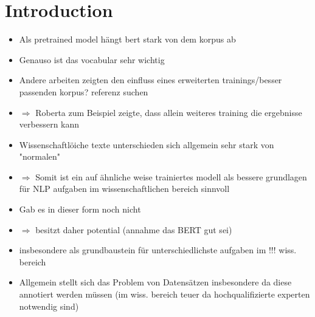 \chapter{Introduction}
\color{ForestGreen}
\begin{itemize}
	\item Als pretrained model hängt bert stark von dem korpus ab
	\item Genauso ist das vocabular sehr wichtig
	\item Andere arbeiten zeigten den einfluss eines erweiterten trainings/besser passenden korpus? referenz suchen
	\item $\Longrightarrow$ Roberta zum Beispiel zeigte, dass allein weiteres training die ergebnisse verbessern kann
	\item Wissenschaftlöiche texte unterschieden sich allgemein sehr stark von "normalen"
	\item $\Rightarrow$ Somit ist ein auf ähnliche weise trainiertes modell als bessere grundlagen für NLP aufgaben im wissenschaftlichen bereich sinnvoll
	\item Gab es in dieser form noch nicht
	\item $\Rightarrow$ besitzt daher potential (annahme das BERT gut sei)
	\item insbesondere als grundbaustein für unterschiedlichste aufgaben im !!! wiss. bereich
	\item Allgemein stellt sich das Problem von Datensätzen insbesondere da diese annotiert werden müssen (im wiss. bereich teuer da hochqualifizierte experten notwendig sind)
\end{itemize}
\color{black}